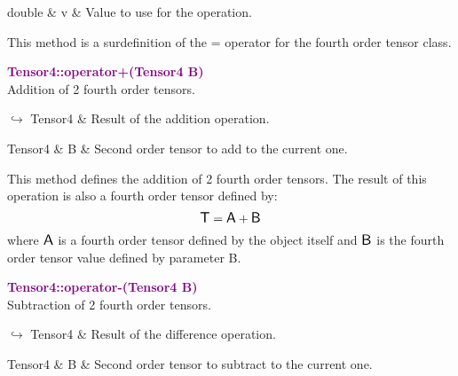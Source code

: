 \begin{tcolorbox}[width=\textwidth,myArgs,tabularx={ll|R}]
double & v & Value to use for the operation.
\end{tcolorbox}

This method is a surdefinition of the = operator for the fourth order tensor class.

\textcolor{purple}{\textbf{Tensor4::operator+(Tensor4 B)}}\label{Tensor4::operator+(Tensor4 B)}\\
Addition of 2 fourth order tensors.\vspace*{-0.5em}
\begin{tcolorbox}[grow to left by=-1cm, width=\textwidth-1cm,myArgs,tabularx={l|R}]
$\hookrightarrow$ Tensor4 & Result of the addition operation.
\end{tcolorbox}

\begin{tcolorbox}[width=\textwidth,myArgs,tabularx={ll|R}]
Tensor4 & B & Second order tensor to add to the current one.
\end{tcolorbox}

This method defines the addition of 2 fourth order tensors.
The result of this operation is also a fourth order tensor defined by:
\begin{equation*}
\mbox{\large\ensuremath{\mathsf{T}}} = \mbox{\large\ensuremath{\mathsf{A}}} + \mbox{\large\ensuremath{\mathsf{B}}}
\end{equation*}
where $\mbox{\large\ensuremath{\mathsf{A}}}$ is a fourth order tensor defined by the object itself and $\mbox{\large\ensuremath{\mathsf{B}}}$ is the fourth order tensor value defined by parameter B.

\textcolor{purple}{\textbf{Tensor4::operator-(Tensor4 B)}}\label{Tensor4::operator-(Tensor4 B)}\\
Subtraction of 2 fourth order tensors.\vspace*{-0.5em}
\begin{tcolorbox}[grow to left by=-1cm, width=\textwidth-1cm,myArgs,tabularx={l|R}]
$\hookrightarrow$ Tensor4 & Result of the difference operation.
\end{tcolorbox}

\begin{tcolorbox}[width=\textwidth,myArgs,tabularx={ll|R}]
Tensor4 & B & Second order tensor to subtract to the current one.
\end{tcolorbox}

